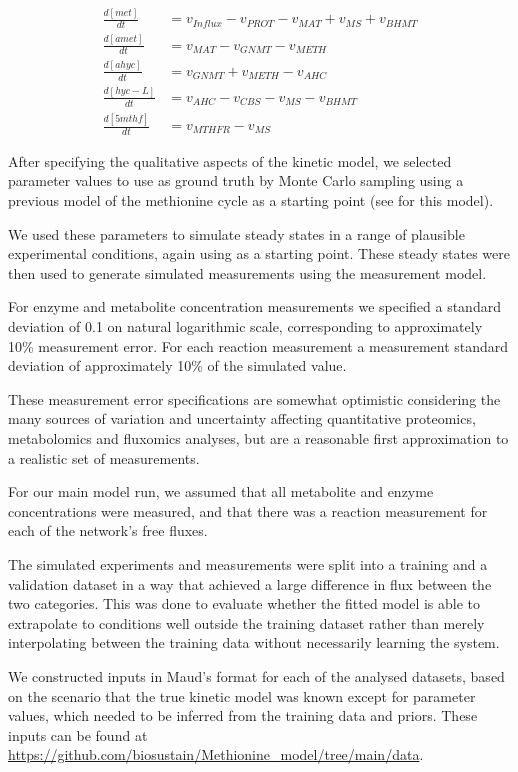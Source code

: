 \documentclass[journal=asbcd6,manuscript=article,layout=traditional]{achemso}
\begin{document}
\begin{align}
\frac{d[met]}{dt} &= v_{Influx} - v_{PROT} - v_{MAT} +v_{MS} + v_{BHMT} \label{eq-meth-ode} \\
\frac{d[amet]}{dt} &= v_{MAT} - v_{GNMT} - v_{METH} \nonumber \\
\frac{d[ahyc]}{dt} &= v_{GNMT} + v_{METH} - v_{AHC} \nonumber \\
\frac{d[hyc-L]}{dt} &= v_{AHC} - v_{CBS} - v_{MS} - v_{BHMT} \nonumber \\
\frac{d[5mthf]}{dt} &= v_{MTHFR} - v_{MS} \nonumber 
\end{align}

After specifying the qualitative aspects of the kinetic model, we
selected parameter values to use as ground truth by Monte Carlo sampling
using a previous model of the methionine cycle as a starting point (see
\citet{saa_construction_2016} for this model).

We used these parameters to simulate steady states in a range of
plausible experimental conditions, again using
\citet{saa_construction_2016} as a starting point. These steady states
were then used to generate simulated measurements using the measurement
model.

For enzyme and metabolite concentration measurements we specified a
standard deviation of 0.1 on natural logarithmic scale, corresponding to
approximately 10\% measurement error. For each reaction measurement a
measurement standard deviation of approximately 10\% of the simulated
value.

These measurement error specifications are somewhat optimistic
considering the many sources of variation and uncertainty affecting
quantitative proteomics, metabolomics and fluxomics analyses, but are a
reasonable first approximation to a realistic set of measurements.

For our main model run, we assumed that all metabolite and enzyme
concentrations were measured, and that there was a reaction measurement
for each of the network's free fluxes.

The simulated experiments and measurements were split into a training
and a validation dataset in a way that achieved a large difference in
flux between the two categories. This was done to evaluate whether the
fitted model is able to extrapolate to conditions well outside the
training dataset rather than merely interpolating between the training
data without necessarily learning the system.

We constructed inputs in Maud's format for each of the analysed
datasets, based on the scenario that the true kinetic model was known
except for parameter values, which needed to be inferred from the
training data and priors. These inputs can be found at
\url{https://github.com/biosustain/Methionine_model/tree/main/data}.
\end{document}
